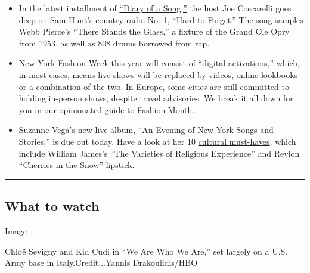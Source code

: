\begin{itemize}
\item
  In the latest installment of
  \href{https://www.nytimes3xbfgragh.onion/2020/09/10/arts/music/sam-hunt-hard-to-forget.html}{``Diary
  of a Song,''} the host Joe Coscarelli goes deep on Sam Hunt's country
  radio No. 1, ``Hard to Forget.'' The song samples Webb Pierce's
  ``There Stands the Glass,'' a fixture of the Grand Ole Opry from 1953,
  as well as 808 drums borrowed from rap.
\item
  New York Fashion Week this year will consist of ``digital
  activations,'' which, in most cases, means live shows will be replaced
  by videos, online lookbooks or a combination of the two. In Europe,
  some cities are still committed to holding in-person shows, despite
  travel advisories. We break it all down for you in
  \href{https://www.nytimes3xbfgragh.onion/2020/09/08/style/fashion-month-schedule.html}{our
  opinionated guide to Fashion Month}.
\item
  Suzanne Vega's new live album, ``An Evening of New York Songs and
  Stories,'' is due out today. Have a look at her 10
  \href{https://www.nytimes3xbfgragh.onion/2020/09/08/arts/music/suzanne-vega-favorites.html}{cultural
  must-haves}, which include William James's ``The Varieties of
  Religious Experience'' and Revlon ``Cherries in the Snow'' lipstick.
\end{itemize}

\begin{center}\rule{0.5\linewidth}{\linethickness}\end{center}

\hypertarget{what-to-watch}{%
\subsection{What to watch}\label{what-to-watch}}

Image

Chloë Sevigny and Kid Cudi in ``We Are Who We Are,'' set largely on a
U.S. Army base in Italy.Credit...Yannis Drakoulidis/HBO

